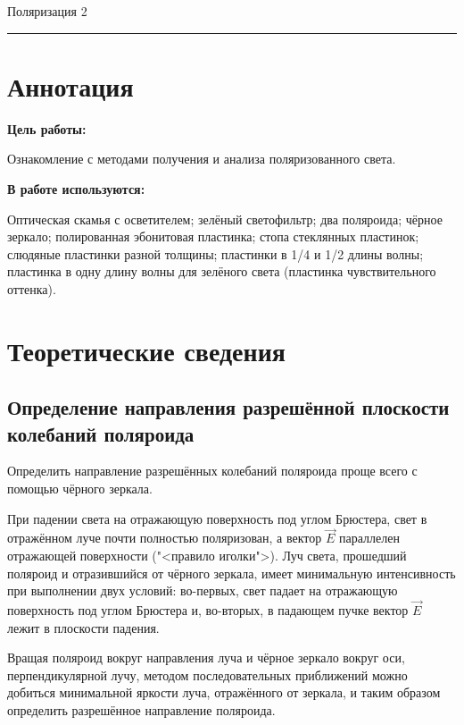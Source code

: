 \documentclass[12pt,a4paper]{scrartcl}
\begin{document}
	
	\begin{flushleft}
		\footnotesize{Поляризация} \hspace{\fill} \footnotesize{2}
		\\[-0.3cm]\noindent\rule{\textwidth}{0.3pt}
	\end{flushleft}
	
	\section{Аннотация}
	
	\textbf{Цель работы: }
	
	Ознакомление с методами получения и анализа поляризованного света.
		
	\textbf{В работе используются:}
	
	Оптическая скамья с осветителем; зелёный светофильтр; два поляроида; чёрное зеркало; полированная эбонитовая пластинка; стопа стеклянных пластинок; слюдяные пластинки разной толщины; пластинки в 1/4 и 1/2 длины волны; пластинка в одну длину волны для зелёного света (пластинка чувствительного оттенка).
	
	\section{Теоретические сведения}
	
	\subsection{Определение направления разрешённой плоскости колебаний поляроида}
	
	Определить направление разрешённых колебаний поляроида проще всего с помощью чёрного зеркала.
	
	При падении света на отражающую поверхность под углом Брюстера, свет в отражённом луче почти полностью поляризован, а вектор $\vec{E}$ параллелен отражающей поверхности ("<правило иголки">). Луч света,
	прошедший поляроид и отразившийся от чёрного зеркала, имеет минимальную интенсивность при выполнении двух условий: во-первых, свет падает на отражающую поверхность под углом Брюстера и, во-вторых,
	в падающем пучке вектор $\vec{E}$ лежит в плоскости падения.
	
	Вращая поляроид вокруг направления луча и чёрное зеркало вокруг
	оси, перпендикулярной лучу, методом последовательных приближений
	можно добиться минимальной яркости луча, отражённого от зеркала,
	и таким образом определить разрешённое направление поляроида.
	
\end{document}
